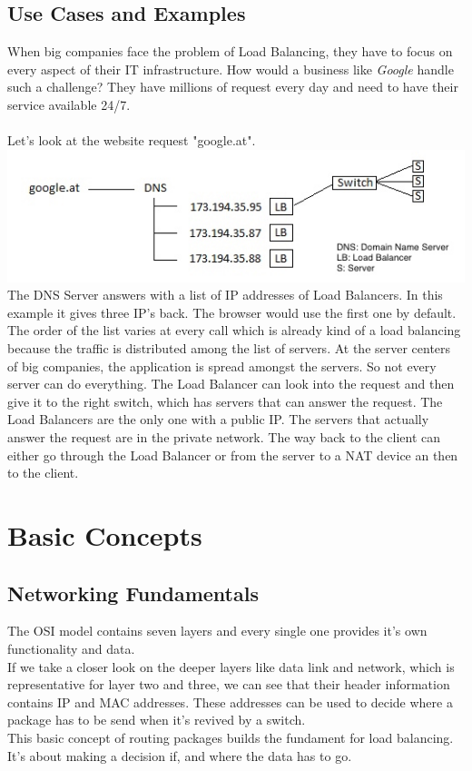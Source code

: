\documentclass[12p]{article}
\begin{document}
	\subsection{Use Cases and Examples}
	When big companies face the problem of Load Balancing, they have to focus on every aspect of their IT infrastructure. How would a business like \textit{Google} handle such a challenge? They have millions of request every day and need to have their service available 24/7. \\\\
	Let's look at the website request "google.at".\\
	\includegraphics[width=\textwidth]{img/example}
 	The DNS Server answers with a list of IP addresses of Load Balancers. In this example it gives three IP's back. The browser would use the first one by default. The order of the list varies at every call which is already kind of a load balancing because the traffic is distributed among the list of servers. At the server centers of big companies, the application is spread amongst the servers. So not every server can do everything. The Load Balancer can look into the request and then give it to the right switch, which has servers that can answer the request. The Load Balancers are the only one with a public IP. The servers that actually answer the request are in the private network. The way back to the client can either go through the Load Balancer or from the server to a NAT device an then to the client.
	
	\newpage
	\section{Basic Concepts}
	\subsection{Networking Fundamentals}
	The OSI model contains seven layers and every single one provides it's own functionality and data.\\
	If we take a closer look on the deeper layers like data link and network, which is representative for layer two and three, we can see that their header information contains IP and MAC addresses. These addresses can be used to decide where a package has to be send when it's revived by a switch.\\
	This basic concept of routing packages builds the fundament for load balancing. It's about making a decision if, and where the data has to go. \cite{lb_SFC}
	
\end{document}
